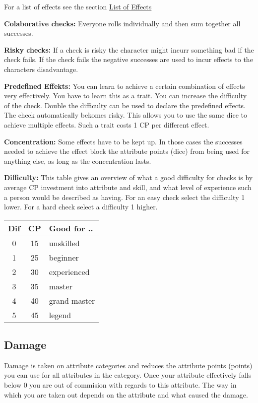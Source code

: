 \documentclass[11pt]{article}
\begin{document}
{\begin{multicols}{2}[]
For a list of effects see the section \hyperref[sec:org2d39862]{List of Effects}


\textbf{Colaborative checks:}
Everyone rolls individually and then sum together all successes.

\textbf{Risky checks:}
If a check is risky the character might incurr something bad if the check fails. If the check fails the negative successes are used to incur effects to the characters disadvantage. 

\textbf{Predefined Effekts:}
You can learn to achieve a certain combination of effects very effectively. You have to learn this as a trait. You can increase the difficulty of the check. Double the difficulty can be used to declare the predefined effects. The check automatically bekomes risky. This allows you to use the same dice to achieve multiple effects. Such a trait costs 1 CP per different effect.

\textbf{Concentration:}
Some effects have to be kept up. In those cases the successes needed to achieve the effect block the attribute points (dice) from being used for anything else, as long as the concentration lasts. 

\textbf{Difficulty:}
This table gives an overview of what a good difficulty for checks is by average CP investment into attribute and skill, and what level of experience such a person would be described as having. For an easy check select the difficulty 1 lower. For a hard check select a difficulty 1 higher.

\begin{center}
\begin{tabular}{c|c|l}
\textbf{Dif} & \textbf{CP} & \textbf{Good for ..}\\
\hline
0 & 15 & unskilled\\
1 & 25 & beginner\\
2 & 30 & experienced\\
3 & 35 & master\\
4 & 40 & grand master\\
5 & 45 & legend\\
\end{tabular}
\end{center}


\subsection{Damage}
\label{sec:org4519479}
Damage is taken on attribute categories and reduces the attribute points (points) you can use for all attributes in the category.  Once your attribute effectively falls below 0 you are out of commision with regards to this attribute. The way in which you are taken out depends on the attribute and what caused the damage.


\end{multicols}}
\end{document}
